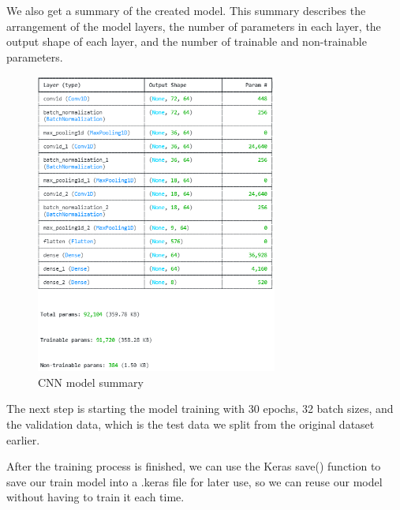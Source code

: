 We also get a summary of the created model. This summary describes the arrangement of the model layers, the number of parameters in each layer, the output shape of each layer, and the number of trainable and non-trainable parameters.



\newpage

\begin{figure}[h]
	\centering
	\includegraphics[width=300px]{figures/CNN_model_summary.png}
	\caption{CNN model summary}
	\label{fig:test}
\end{figure}


The next step is starting the model training with 30 epochs, 32 batch sizes, and the validation data, which is the test data we split from the original dataset earlier.





After the training process is finished, we can use the Keras save() function to save our train model into a .keras file for later use, so we can reuse our model without having to train it each time.











